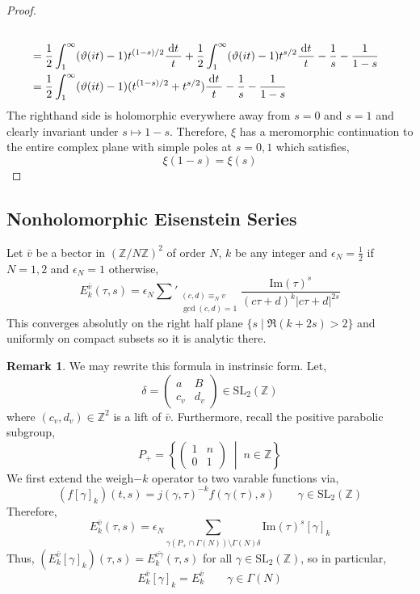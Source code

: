 \documentclass{article}
\newcommand{\SL}[2]{\mathrm{SL}_{#1}(#2)}
\newcommand{\Z}{\mathbb{Z}}
\renewcommand{\Im}[1]{\mathrm{Im}(#1)}
\renewcommand{\d}[1]{\: \mathrm{d}#1 \:}
\theoremstyle{definition}
\newtheorem{remark}{Remark}[section]
\newenvironment{definition}[1][Definition:]{\begin{trivlist}
\item[\hskip \labelsep {\bfseries #1}]}{\end{trivlist}}
\begin{document}
\begin{proof}
\begin{align*}
\\
& = \frac{1}{2} \int_1^\infty (\vt(it) - 1) t^{(1 - s)/2} \frac{\d{t}}{t} + \frac{1}{2} \int_1^\infty (\vt(it) - 1) t^{s/2} \frac{\d{t}}{t} - \frac{1}{s} - \frac{1}{1 - s}
\\
& = \frac{1}{2} \int_1^\infty (\vt(it) - 1) (t^{(1 - s)/2} + t^{s / 2}) \frac{\d{t}}{t} - \frac{1}{s} - \frac{1}{1 - s} 
\end{align*}
The righthand side is holomorphic everywhere away from $s = 0$ and $s = 1$ and clearly invariant under $s \mapsto 1 - s$. Therefore, $\xi$ has a meromorphic continuation to the entire complex plane with simple poles at $s = 0, 1$ which satisfies,
\[ \xi(1 - s) = \xi(s) \]
\end{proof}

\subsection{Nonholomorphic Eisenstein Series}

\begin{definition}
Let $\bar{v}$ be a bector in $(\Z / N \Z)^2$ of order $N$, $k$ be any integer and $\epsilon_N = \frac{1}{2}$ if $N = 1,2$ and $\epsilon_N = 1$ otherwise,
\[ E^{\bar{v}}_k(\tau, s) = \epsilon_N \sum'_{\substack{(c,d) \equiv_N v \\ \gcd(c,d) = 1}} \frac{\Im{\tau}^s}{(c \tau + d)^k |c \tau + d|^{2 s}} \]
This converges absolutly on the right half plane $\{s \mid \Re(k + 2 s) > 2 \}$ and uniformly on compact subsets so it is analytic there. 
\end{definition}

\begin{remark}
We may rewrite this formula in instrinsic form. Let,
\[ \delta = \begin{pmatrix}
a & B 
\\
c_v & d_v 
\end{pmatrix} \in \SL{2}{\Z} \]
where $(c_v, d_v) \in \Z^2$ is a lift of $\bar{v}$. Furthermore, recall the positive parabolic subgroup,
\[ P_+ = \left\{ \begin{pmatrix}
1 & n
\\
0 & 1 
\end{pmatrix}
\; \middle| \; n \in \Z \right\} \]
We first extend the weigh$-k$ operator to two varable functions via,
\[ (f[\gamma]_k)(t,s) = j(\gamma, \tau)^{-k} f(\gamma(\tau), s) \quad \quad \gamma \in \SL{2}{\Z} \]
Therefore,
\[ E_k^{\bar{v}}(\tau, s) = \epsilon_N \sum_{\gamma (P_+ \cap \Gamma(N)) \setminus \Gamma(N) \delta} \Im{\tau}^s [\gamma]_k \]
Thus, $(E^{\bar{v}}_k [\gamma]_k)(\tau, s) = E^{\bar{v \gamma}}_k(\tau, s)$ for all $\gamma \in  \SL{2}{\Z}$, so in particular, 
\[ E^{\bar{v}}_k [\gamma]_k = E^{\bar{v}}_k \quad \quad \gamma \in \Gamma(N) \]
\end{remark}
\end{document}
